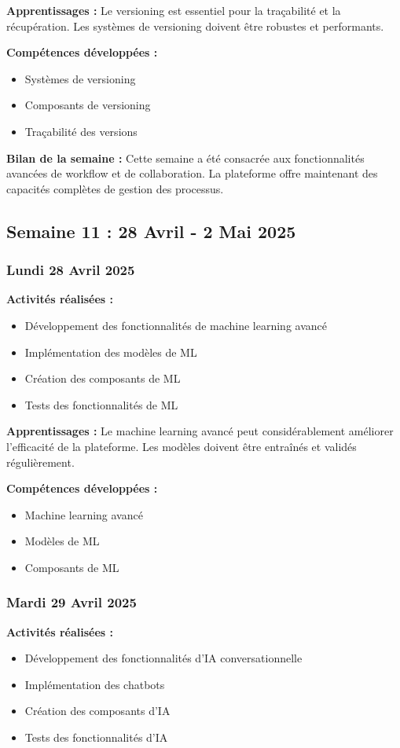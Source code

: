 \documentclass[12pt,a4paper]{article}
\begin{document}
\textbf{Apprentissages :}
Le versioning est essentiel pour la traçabilité et la récupération. Les systèmes de versioning doivent être robustes et performants.

\textbf{Compétences développées :}
\begin{itemize}
    \item Systèmes de versioning
    \item Composants de versioning
    \item Traçabilité des versions
\end{itemize}

\textbf{Bilan de la semaine :}
Cette semaine a été consacrée aux fonctionnalités avancées de workflow et de collaboration. La plateforme offre maintenant des capacités complètes de gestion des processus.

\clearpage
\subsection{Semaine 11 : 28 Avril - 2 Mai 2025}

\subsubsection{Lundi 28 Avril 2025}
\textbf{Activités réalisées :}
\begin{itemize}
    \item Développement des fonctionnalités de machine learning avancé
    \item Implémentation des modèles de ML
    \item Création des composants de ML
    \item Tests des fonctionnalités de ML
\end{itemize}

\textbf{Apprentissages :}
Le machine learning avancé peut considérablement améliorer l'efficacité de la plateforme. Les modèles doivent être entraînés et validés régulièrement.

\textbf{Compétences développées :}
\begin{itemize}
    \item Machine learning avancé
    \item Modèles de ML
    \item Composants de ML
\end{itemize}

\subsubsection{Mardi 29 Avril 2025}
\textbf{Activités réalisées :}
\begin{itemize}
    \item Développement des fonctionnalités d'IA conversationnelle
    \item Implémentation des chatbots
    \item Création des composants d'IA
    \item Tests des fonctionnalités d'IA
\end{itemize}
\end{document}

